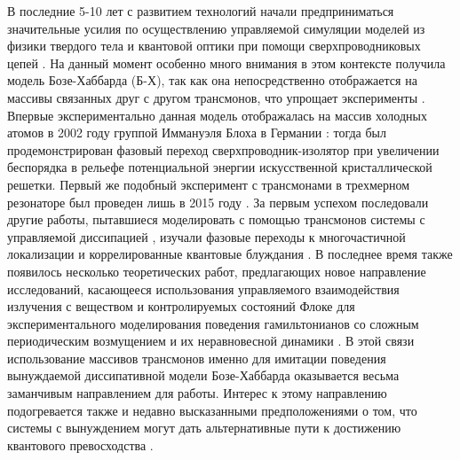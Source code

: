 \documentclass[14pt, a4paper]{extreport}
\numberwithin{equation}{section}
\begin{document}
В последние 5-10 лет с развитием технологий начали предприниматься значительные усилия по осуществлению управляемой симуляции моделей из физики твердого тела и квантовой оптики при помощи сверхпроводниковых цепей \cite{kjaergaard2020superconducting}. На данный момент особенно много внимания в этом контексте получила модель Бозе-Хаббарда (Б-Х), так как она непосредственно отображается на массивы связанных друг с другом трансмонов, что упрощает эксперименты \cite{orell2019probing,yanay2020two}. Впервые экспериментально данная модель отображалась на массив холодных атомов в 2002 году группой Иммануэля Блоха в Германии \cite{greiner2002quantum}: тогда был продемонстрирован фазовый переход сверхпроводник-изолятор при увеличении беспорядка в рельефе потенциальной энергии искусственной кристаллической решетки. Первый же подобный эксперимент с трансмонами в трехмерном резонаторе был проведен лишь в 2015 году \cite{hacohen2015cooling}. За первым успехом последовали другие работы, пытавшиеся моделировать с помощью трансмонов системы с управляемой диссипацией \cite{ma2019dissipatively}, изучали фазовые переходы к многочастичной локализации \cite{roushan2017spectroscopic,chiaro2019growth, collodo2019observation} и коррелированные квантовые блуждания \cite{Yan2019, Ye2019}. В последнее время также появилось несколько теоретических работ, предлагающих новое направление исследований, касающееся использования управляемого взаимодействия излучения с веществом и контролируемых состояний Флоке для экспериментального моделирования поведения гамильтонианов со сложным периодическим возмущением и их неравновесной динамики \cite{Goldman2014, eisert2015quantum, Zippilli2015, kyriienko2018floquet, franca2020simulating}. В этой связи использование массивов трансмонов именно для имитации поведения вынуждаемой диссипативной модели Бозе-Хаббарда оказывается весьма заманчивым направлением для работы. Интерес к этому направлению подогревается также и недавно высказанными предположениями о том, что системы с вынуждением могут дать альтернативные пути к достижению квантового превосходства \cite{tangpanitanon2019quantum}.
\end{document}

